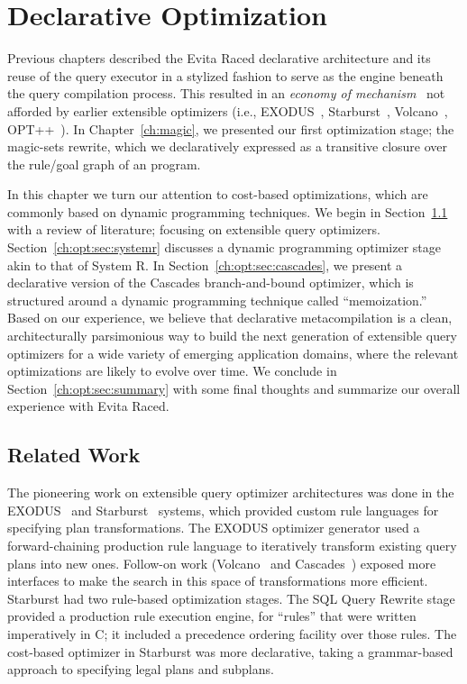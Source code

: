 \chapter[Declarative Optimization]{Declarative Optimization}
\label{ch:opt}

Previous chapters described the Evita Raced declarative architecture and its
reuse of the query executor in a stylized fashion to serve as the engine
beneath the query compilation process.  This resulted in an {\em economy of
mechanism}~\cite{Saltzer75theprotection} not afforded by earlier extensible
optimizers (i.e., EXODUS~\cite{exodus}, Starburst~\cite{phh92},
Volcano~\cite{volcano}, OPT++~\cite{opt++}).  In Chapter~\ref{ch:magic}, we
presented our first optimization stage; the magic-sets rewrite, which we
declaratively expressed as a transitive closure over the rule/goal graph of an
\OVERLOG program.

In this chapter we turn our attention to cost-based optimizations, which are
commonly based on dynamic programming techniques.  We begin in
Section~\ref{ch:opt:sec:related} with a review of literature; focusing on
extensible query optimizers.  Section~\ref{ch:opt:sec:systemr} discusses a
dynamic programming optimizer stage akin to that of System R.  In
Section~\ref{ch:opt:sec:cascades}, we present a declarative version of the
Cascades branch-and-bound optimizer, which is structured around a dynamic
programming technique called ``memoization.'' Based on our experience, we
believe that declarative metacompilation is a clean, architecturally
parsimonious way to build the next generation of extensible query optimizers
for a wide variety of emerging application domains, where the relevant
optimizations are likely to evolve over time.  We conclude in
Section~\ref{ch:opt:sec:summary} with some final thoughts and summarize our
overall experience with Evita Raced.

\section{Related Work}
\label{ch:opt:sec:related}

The pioneering work on extensible query optimizer architectures was done in the
EXODUS~\cite{exodus} and Starburst~\cite{lohman,phh92} systems, which provided
custom rule languages for specifying plan transformations.  The EXODUS
optimizer generator used a forward-chaining production rule language to iteratively
transform existing query plans into new ones.  Follow-on work
(Volcano~\cite{volcano} and Cascades~\cite{cascades}) exposed more interfaces
to make the search in this space of transformations more efficient.  Starburst
had two rule-based optimization stages.  The SQL Query Rewrite stage provided a
production rule execution engine, for ``rules'' that were written imperatively
in C; it included a precedence ordering facility over those rules.  The
cost-based optimizer in Starburst was more declarative, taking a grammar-based
approach to specifying legal plans and subplans.

